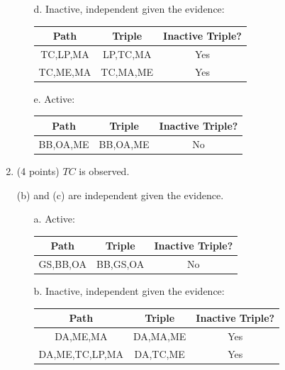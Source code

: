 \documentclass[12pt]{article}
\begin{document}
\begin{enumerate}
\begin{enumerate}
		\item[d.]
		Inactive, independent given the evidence:
		\begin{center}
			\begin{tabular}{|c|c|c|}
				\hline
				Path & Triple & Inactive Triple? \\
				\hline
				TC,LP,MA & LP,TC,MA & Yes \\
				\hline
				TC,ME,MA & TC,MA,ME & Yes \\
				\hline
			\end{tabular}
		\end{center}

		\item[e.]
		Active:
		\begin{center}
			\begin{tabular}{|c|c|c|}
				\hline
				Path & Triple & Inactive Triple? \\
				\hline
				BB,OA,ME & BB,OA,ME & No \\
				\hline
			\end{tabular}
		\end{center}

	\end{enumerate}

	\item (4 points) $TC$ is observed.

	(b) and (c) are independent given the evidence.

	\begin{enumerate}
		\item[a.]
		Active:
		\begin{center}
			\begin{tabular}{|c|c|c|}
				\hline
				Path & Triple & Inactive Triple? \\
				\hline
				GS,BB,OA & BB,GS,OA & No \\
				\hline
			\end{tabular}
		\end{center}

		\item[b.]
		Inactive, independent given the evidence:
		\begin{center}
			\begin{tabular}{|c|c|c|}
				\hline
				Path & Triple & Inactive Triple? \\
				\hline
				DA,ME,MA & DA,MA,ME & Yes \\
				\hline
				DA,ME,TC,LP,MA & DA,TC,ME & Yes \\
				\hline
			\end{tabular}
		\end{center}


\end{enumerate}
\end{enumerate}
\end{document}
